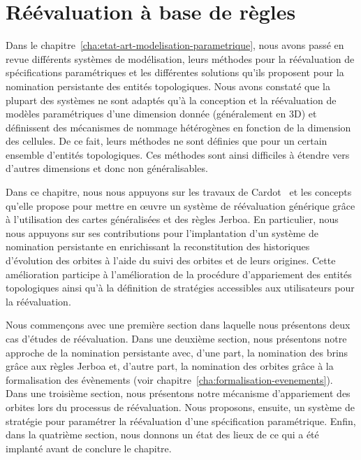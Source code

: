 \chapter{Réévaluation à base de règles}
\label{cha:reevaluation-base-regles}

Dans le chapitre~\ref{cha:etat-art-modelisation-parametrique}, nous avons passé
en revue différents systèmes de modélisation, leurs méthodes pour la
réévaluation de spécifications paramétriques et les différentes solutions qu'ils
proposent pour la nomination persistante des entités topologiques. %
Nous avons constaté que la plupart des systèmes ne sont adaptés qu'à la
conception et la réévaluation de modèles paramétriques d'une dimension donnée
(généralement en 3D) et définissent des mécanismes de nommage hétérogènes en
fonction de la dimension des cellules. %
De ce fait, leurs méthodes ne sont définies que pour un certain ensemble
d'entités topologiques. %
Ces méthodes sont ainsi difficiles à étendre vers d'autres dimensions et donc
non généralisables. %

Dans ce chapitre, nous nous appuyons sur les travaux de Cardot~\cite{cardot2019}
et les concepts qu'elle propose pour mettre en \oe uvre un système de
réévaluation générique grâce à l'utilisation des cartes généralisées et des
règles Jerboa. %
En particulier, nous nous appuyons sur ses contributions pour l'implantation d'un système de
nomination persistante en enrichissant la reconstitution des historiques d'évolution des
orbites à l'aide du suivi des orbites et de leurs origines. %
Cette amélioration participe à l'amélioration de la procédure
d'appariement des entités topologiques ainsi qu'à la définition de stratégies
accessibles aux utilisateurs pour la réévaluation. %

Nous commençons avec une première section dans laquelle nous
présentons deux cas d'études de réévaluation. %
Dans une deuxième section, nous présentons notre approche de la
nomination persistante avec, d'une part, la nomination des brins grâce aux
règles Jerboa et, d'autre part, la nomination des orbites grâce à la
formalisation des évènements (voir
chapitre~\ref{cha:formalisation-evenements}). %
Dans une troisième section, nous présentons notre mécanisme d'appariement des
orbites lors du processus de réévaluation. %
Nous proposons, ensuite, un système de stratégie pour paramétrer la réévaluation
d'une spécification paramétrique. %
Enfin, dans la quatrième section, nous donnons un état des lieux de ce qui a été
implanté avant de conclure le chapitre. %

%


